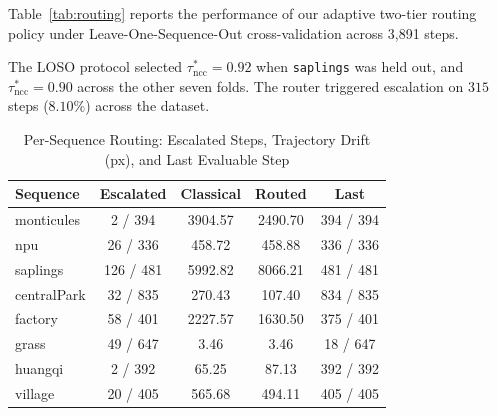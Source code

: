 \documentclass[conference]{IEEEtran}
\begin{document}
Table~\ref{tab:routing} reports the performance of our adaptive two-tier routing policy under Leave-One-Sequence-Out cross-validation across 3,891 steps.

\begin{table}[h]
\centering
\caption{Adaptive Matcher Routing Performance Under LOSO Cross-Validation (3,891 Steps)}
\label{tab:routing}
\footnotesize

\end{table}

The LOSO protocol selected $\tau_{\mathrm{ncc}}^* = 0.92$ when \texttt{saplings} was held out, and $\tau_{\mathrm{ncc}}^* = 0.90$ across the other seven folds. The router triggered escalation on $315$ steps ($8.10\%$) across the dataset.

\begin{table}[t]
\centering
\caption{Per-Sequence Routing: Escalated Steps, Trajectory Drift (px), and Last Evaluable Step}
\label{tab:routing_breakdown}
\footnotesize
\begin{tabular}{@{}lcccc@{}}
\toprule
Sequence & Escalated & Classical & Routed & Last \\
\midrule
monticules & 2 / 394 & 3904.57 & 2490.70 & 394 / 394 \\
npu & 26 / 336 & 458.72 & 458.88 & 336 / 336 \\
saplings & 126 / 481 & 5992.82 & 8066.21 & 481 / 481 \\
centralPark & 32 / 835 & 270.43 & 107.40 & 834 / 835 \\
factory & 58 / 401 & 2227.57 & 1630.50 & 375 / 401 \\
grass & 49 / 647 & 3.46 & 3.46 & 18 / 647 \\
huangqi & 2 / 392 & 65.25 & 87.13 & 392 / 392 \\
village & 20 / 405 & 565.68 & 494.11 & 405 / 405 \\
\bottomrule
\end{tabular}
\end{table}
\end{document}
